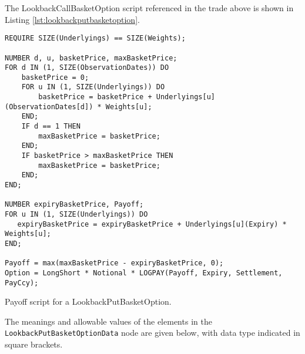 The LookbackCallBasketOption script referenced in the trade above is
shown in Listing \ref{lst:lookbackputbasketoption}.

\begin{listing}[hbt]
\begin{verbatim}
REQUIRE SIZE(Underlyings) == SIZE(Weights);

NUMBER d, u, basketPrice, maxBasketPrice;
FOR d IN (1, SIZE(ObservationDates)) DO
    basketPrice = 0;
    FOR u IN (1, SIZE(Underlyings)) DO
        basketPrice = basketPrice + Underlyings[u](ObservationDates[d]) * Weights[u];
    END;
    IF d == 1 THEN
        maxBasketPrice = basketPrice;
    END;
    IF basketPrice > maxBasketPrice THEN
        maxBasketPrice = basketPrice;
    END;
END;

NUMBER expiryBasketPrice, Payoff;
FOR u IN (1, SIZE(Underlyings)) DO
   expiryBasketPrice = expiryBasketPrice + Underlyings[u](Expiry) * Weights[u];
END;

Payoff = max(maxBasketPrice - expiryBasketPrice, 0);
Option = LongShort * Notional * LOGPAY(Payoff, Expiry, Settlement, PayCcy);
\end{verbatim}
\caption{Payoff script for a LookbackPutBasketOption.}
\label{lst:lookbackputbasketoption}
\end{listing}

The meanings and allowable values of the elements in the
\lstinline!LookbackPutBasketOptionData! node are given below, with data
type indicated in square brackets.

